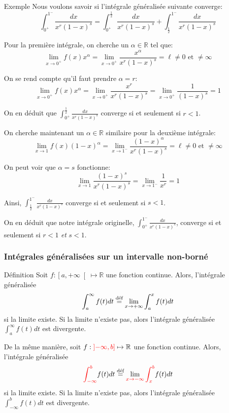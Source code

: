 \documentclass[a4paper]{article}
\begin{document}
\begin{parag}{Exemple}
    Nous voulons savoir si l'intégrale généralisée suivante converge:
    \[\int_{0^+}^{1^-} \frac{dx}{x^r \left(1 - x\right)^s} = \int_{0^+}^{\frac{1}{2}} \frac{dx}{x^r \left(1 - x\right)^s} + \int_{\frac{1}{2}}^{1^-} \frac{dx}{x^r \left(1 - x\right)^s}\]
    
    Pour la première intégrale, on cherche un $\alpha \in\mathbb{R}$ tel que: 
    \[\lim_{x \to 0^+} f\left(x\right)x^{\alpha} = \lim_{x \to 0^+}  \frac{x^{\alpha}}{x^r\left(1 - x\right)^s} = \ell \neq 0 \text{ et } \neq\infty\]
    
    On se rend compte qu'il faut prendre $\alpha = r$: 
    \[\lim_{x \to 0^+} f\left(x\right)x^{\alpha} = \lim_{x \to 0^+} \frac{x^r}{x^r\left(1 - x\right)^s} = \lim_{x \to 0^+} \frac{1}{\left(1 - x\right)^s} = 1\]
    
    On en déduit que $\int_{0^+}^{\frac{1}{2}} \frac{dx}{x^r \left(1 - x\right)^s}$ converge si et seulement si $r < 1$. 

    On cherche maintenant un $\alpha \in \mathbb{R}$ similaire pour la deuxième intégrale: 
    \[\lim_{x \to 1} f\left(x\right)\left(1 - x\right)^{\alpha} = \lim_{x \to 1^-}  \frac{\left(1 - x\right)^{\alpha}}{x^r \left(1 - x\right)^s} = \ell \neq 0 \text{ et } \neq \infty\]
    
    On peut voir que $\alpha = s$ fonctionne: 
    \[\lim_{x \to 1} \frac{\left(1 - x\right)^s}{x^r\left(1 - x\right)^s} = \lim_{x \to 1^-} \frac{1}{x^r} = 1\]
    
    Ainsi, $\int_{\frac{1}{2}}^{1^-} \frac{dx}{x^r\left(1- x\right)^s}$ converge si et seulement si $s < 1$.

    On en déduit que notre intégrale originelle, $\int_{0^+}^{1^-} \frac{dx}{x^r \left(1 - x\right)^s}$, converge si et seulement si $r < 1$ \textit{et} $s < 1$.
\end{parag}

\subsubsection{Intégrales généralisées sur un intervalle non-borné}
\begin{parag}{Définition}
    Soit $f : \left[a, +\infty\right[ \mapsto \mathbb{R}$ une fonction continue. Alors, l'intégrale généralisée 
    \[\int_{a}^{\infty} f\left(t\right)dt \over{=}{déf} \lim_{x \to +\infty} \int_{a}^{x} f\left(t\right)dt\]
    si la limite existe. Si la limite n'existe pas, alors l'intégrale généralisée $\int_{a}^{\infty} f\left(t\right)dt$ est divergente.

    De la même manière, soit $f : {\color{red}\left]-\infty, b\right]} \mapsto \mathbb{R}$ une fonction continue. Alors, l'intégrale généralisée 
    \[{\color{red}\int_{-\infty}^{b}} f\left(t\right)dt \over{=}{déf} \lim_{{\color{red}x \to -\infty}} {\color{red}\int_{x}^{b}} f\left(t\right)dt\]
    si la limite existe. Si la limite n'existe pas, alors l'intégrale généralisée $\int_{-\infty}^{b} f\left(t\right)dt$ est divergente.
\end{parag}
\end{document}
